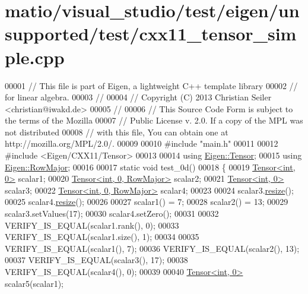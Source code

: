 \hypertarget{matio_2visual__studio_2test_2eigen_2unsupported_2test_2cxx11__tensor__simple_8cpp_source}{}\section{matio/visual\+\_\+studio/test/eigen/unsupported/test/cxx11\+\_\+tensor\+\_\+simple.cpp}
\label{matio_2visual__studio_2test_2eigen_2unsupported_2test_2cxx11__tensor__simple_8cpp_source}

\begin{DoxyCode}
00001 \textcolor{comment}{// This file is part of Eigen, a lightweight C++ template library}
00002 \textcolor{comment}{// for linear algebra.}
00003 \textcolor{comment}{//}
00004 \textcolor{comment}{// Copyright (C) 2013 Christian Seiler <christian@iwakd.de>}
00005 \textcolor{comment}{//}
00006 \textcolor{comment}{// This Source Code Form is subject to the terms of the Mozilla}
00007 \textcolor{comment}{// Public License v. 2.0. If a copy of the MPL was not distributed}
00008 \textcolor{comment}{// with this file, You can obtain one at http://mozilla.org/MPL/2.0/.}
00009 
00010 \textcolor{preprocessor}{#include "main.h"}
00011 
00012 \textcolor{preprocessor}{#include <Eigen/CXX11/Tensor>}
00013 
00014 \textcolor{keyword}{using} \hyperlink{class_eigen_1_1_tensor}{Eigen::Tensor};
00015 \textcolor{keyword}{using} \hyperlink{group__enums_ggaacded1a18ae58b0f554751f6cdf9eb13acfcde9cd8677c5f7caf6bd603666aae3}{Eigen::RowMajor};
00016 
00017 \textcolor{keyword}{static} \textcolor{keywordtype}{void} test\_0d()
00018 \{
00019   \hyperlink{class_eigen_1_1_tensor}{Tensor<int, 0>} scalar1;
00020   \hyperlink{class_eigen_1_1_tensor}{Tensor<int, 0, RowMajor>} scalar2;
00021   \hyperlink{class_eigen_1_1_tensor}{Tensor<int, 0>} scalar3;
00022   \hyperlink{class_eigen_1_1_tensor}{Tensor<int, 0, RowMajor>} scalar4;
00023 
00024   scalar3.\hyperlink{class_eigen_1_1_tensor_a5ab1ec6dc9b05d5e4db3600bc9d2cc6b}{resize}();
00025   scalar4.\hyperlink{class_eigen_1_1_tensor_a5ab1ec6dc9b05d5e4db3600bc9d2cc6b}{resize}();
00026 
00027   scalar1() = 7;
00028   scalar2() = 13;
00029   scalar3.setValues(17);
00030   scalar4.setZero();
00031 
00032   VERIFY\_IS\_EQUAL(scalar1.rank(), 0);
00033   VERIFY\_IS\_EQUAL(scalar1.size(), 1);
00034 
00035   VERIFY\_IS\_EQUAL(scalar1(), 7);
00036   VERIFY\_IS\_EQUAL(scalar2(), 13);
00037   VERIFY\_IS\_EQUAL(scalar3(), 17);
00038   VERIFY\_IS\_EQUAL(scalar4(), 0);
00039 
00040   \hyperlink{class_eigen_1_1_tensor}{Tensor<int, 0>} scalar5(scalar1);

\end{DoxyCode}
